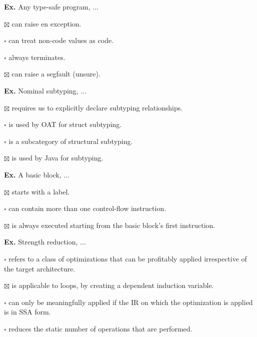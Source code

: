 \hrulefill

\textbf{Ex.} Any type-safe program, ...
\begin{compactitem} 
	\item[$\boxtimes$] can raise en exception.
	\item[$\square$] can treat non-code values as code.
	\item[$\square$] always terminates.
	\item[$\boxtimes$] can raise a segfault (unsure).
\end{compactitem}

\hrulefill

\textbf{Ex.} Nominal subtyping, ...
\begin{compactitem} 
	\item[$\boxtimes$] requires us to explicitly declare subtyping relationships.
	\item[$\square$] is used by OAT for struct subtyping.
	\item[$\square$] is a subcategory of structural subtyping.
	\item[$\boxtimes$] is used by Java for subtyping.
\end{compactitem}

\hrulefill

\textbf{Ex.} A basic block, ...
\begin{compactitem}
	\item[$\boxtimes$] starts with a label.
	\item[$\square$] can contain more than one control-flow instruction.
	\item[$\boxtimes$] is always executed starting from the basic block's first instruction.
\end{compactitem}

\hrulefill

\textbf{Ex.} Strength reduction, ...
\begin{compactitem}
	\item[$\square$] refers to a class of optimizations that can be profitably applied irrespective of the target architecture.
	\item[$\boxtimes$] is applicable to loops, by creating a dependent induction variable.
	\item[$\square$] can only be meaningfully applied if the IR on which the optimization is applied is in SSA form.
	\item[$\square$] reduces the static number of operations that are performed.
\end{compactitem}

